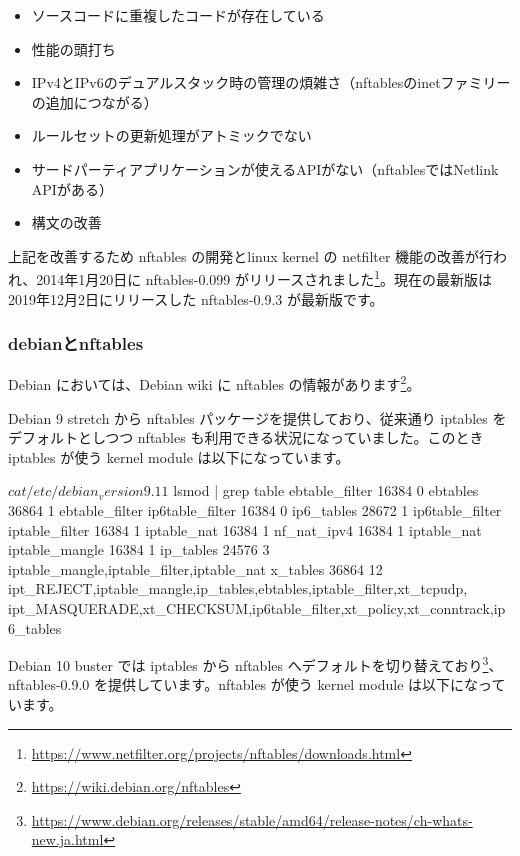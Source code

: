 \documentclass[mingoth,a4paper]{jsarticle}
\begin{document}
\begin{itemize}
\item ソースコードに重複したコードが存在している
\item 性能の頭打ち
\item IPv4とIPv6のデュアルスタック時の管理の煩雑さ（nftablesのinetファミリーの追加につながる）
\item ルールセットの更新処理がアトミックでない
\item サードパーティアプリケーションが使えるAPIがない（nftablesではNetlink APIがある）
\item 構文の改善
\end{itemize}

上記を改善するため nftables の開発とlinux kernel の netfilter 機能の改善が行われ、2014年1月20日に nftables-0.099 がリリースされました\footnote{\url{https://www.netfilter.org/projects/nftables/downloads.html}}。現在の最新版は2019年12月2日にリリースした nftables-0.9.3 が最新版です。


\subsubsection{debianとnftables}

Debian においては、Debian wiki に nftables の情報があります\footnote{\url{https://wiki.debian.org/nftables}}。

Debian 9 stretch から nftables パッケージを提供しており、従来通り iptables をデフォルトとしつつ nftables も利用できる状況になっていました。このとき iptables が使う kernel module は以下になっています。

\begin{commandline}
$ cat /etc/debian_version
9.11  
$ lsmod | grep table
  ebtable_filter         16384  0
  ebtables               36864  1 ebtable_filter
  ip6table_filter        16384  0
  ip6_tables             28672  1 ip6table_filter
  iptable_filter         16384  1
  iptable_nat            16384  1
  nf_nat_ipv4            16384  1 iptable_nat
  iptable_mangle         16384  1
  ip_tables              24576  3 iptable_mangle,iptable_filter,iptable_nat
  x_tables               36864  12 ipt_REJECT,iptable_mangle,ip_tables,ebtables,iptable_filter,xt_tcpudp,
ipt_MASQUERADE,xt_CHECKSUM,ip6table_filter,xt_policy,xt_conntrack,ip6_tables
\end{commandline}

Debian 10 buster では iptables から nftables へデフォルトを切り替えており\footnote{\url{https://www.debian.org/releases/stable/amd64/release-notes/ch-whats-new.ja.html}}、nftables-0.9.0 を提供しています。nftables が使う kernel module は以下になっています。
\end{document}
